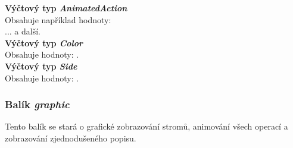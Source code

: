 \documentclass[
  biblatex=false,
  font=serif,
  glossaries=false,
  tables=false,
  theorems=false,
  index
]{kidiplom}
\begin{document}
\noindent \textbf{Výčtový typ \textit{AnimatedAction}}\\
\indent Obsahuje například hodnoty: \\ ... a další.\\

\noindent \textbf{Výčtový typ \textit{Color}}\\
\indent Obsahuje hodnoty: .\\

\noindent \textbf{Výčtový typ \textit{Side}}\\
\indent Obsahuje hodnoty: .\\

\subsubsection{Balík \textit{graphic}}
\indent \indent Tento balík se stará o grafické zobrazování stromů, animování všech operací a zobrazování zjednodušeného popisu.\\ 
\end{document}

